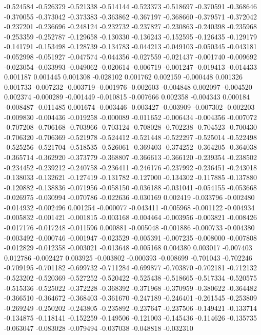 -0.524584
-0.526379
-0.521338
-0.514144
-0.523373
-0.518697
-0.370591
-0.368646
-0.370055
-0.373042
-0.373383
-0.363862
-0.367197
-0.368660
-0.379571
-0.372042
-0.237201
-0.236696
-0.248124
-0.232732
-0.237827
-0.230863
-0.240398
-0.235968
-0.253359
-0.252787
-0.129658
-0.130330
-0.136243
-0.152595
-0.126435
-0.129179
-0.141791
-0.153498
-0.128739
-0.134783
-0.044213
-0.049103
-0.050345
-0.043181
-0.052998
-0.051927
-0.047574
-0.044356
-0.027559
-0.021437
-0.001740
-0.009692
-0.023054
-0.033993
-0.049062
-0.020614
-0.006719
-0.001247
-0.019413
-0.014433
0.001187
0.001445
0.001308
-0.028102
0.001762
0.002159
-0.000448
0.001326
0.001733
-0.007232
-0.003719
-0.001976
-0.002603
-0.004848
0.002097
-0.004520
0.002374
-0.000289
-0.001449
-0.010815
-0.007666
0.002358
-0.004343
0.000184
-0.008487
-0.011485
0.001674
-0.003446
-0.003427
-0.003909
-0.007302
-0.002203
-0.009830
-0.004436
-0.019258
-0.000089
-0.011652
-0.006434
-0.004356
-0.007072
-0.707208
-0.706168
-0.703966
-0.703124
-0.708028
-0.702238
-0.704523
-0.700430
-0.706320
-0.706369
-0.521978
-0.524412
-0.521448
-0.522297
-0.525014
-0.522498
-0.525256
-0.521704
-0.518535
-0.526061
-0.369403
-0.374252
-0.364205
-0.364038
-0.365714
-0.362920
-0.373779
-0.368807
-0.366613
-0.366120
-0.239354
-0.238502
-0.234452
-0.239212
-0.240758
-0.236411
-0.246176
-0.237992
-0.236451
-0.243018
-0.138033
-0.132621
-0.127419
-0.131782
-0.127000
-0.134302
-0.117885
-0.137880
-0.120882
-0.138836
-0.071956
-0.058150
-0.036188
-0.031041
-0.054155
-0.053668
-0.026975
-0.030994
-0.070786
-0.022636
-0.030169
0.002419
-0.033796
-0.002480
-0.014932
-0.002496
0.001254
-0.000077
-0.043411
-0.005968
-0.001122
-0.004934
-0.005832
-0.001421
-0.001815
-0.003168
-0.004464
-0.003956
-0.003821
-0.008426
-0.017176
-0.017248
-0.011596
0.000881
-0.005048
-0.001886
-0.000733
-0.004380
-0.003492
-0.000746
-0.001947
-0.023529
-0.005391
-0.007235
-0.008000
-0.007808
-0.012829
-0.012358
-0.003021
-0.013648
-0.005168
0.004380
0.003017
-0.007403
0.012786
-0.002427
0.003925
-0.003802
-0.000393
-0.008699
-0.701043
-0.702246
-0.709195
-0.701182
-0.699732
-0.711284
-0.699877
-0.703870
-0.702181
-0.712132
-0.523202
-0.520369
-0.527252
-0.520422
-0.525438
-0.518665
-0.517334
-0.520575
-0.515336
-0.525022
-0.372228
-0.368392
-0.371968
-0.370959
-0.380622
-0.364482
-0.366510
-0.364672
-0.368403
-0.361670
-0.247189
-0.246401
-0.261545
-0.253809
-0.269249
-0.250202
-0.243805
-0.235892
-0.237647
-0.237506
-0.149421
-0.133714
-0.134875
-0.118141
-0.152259
-0.149506
-0.121003
-0.145436
-0.114626
-0.135735
-0.063047
-0.083028
-0.079494
-0.037038
-0.048818
-0.032310
